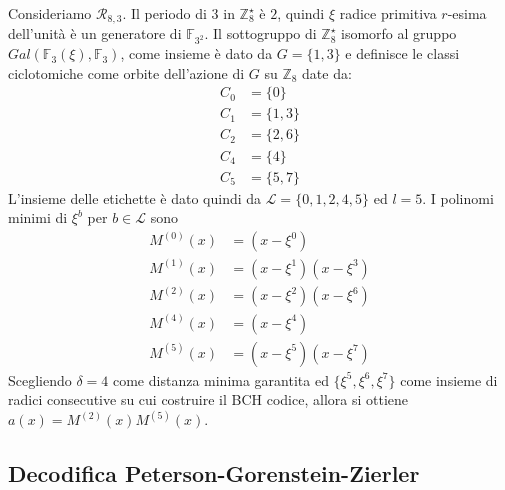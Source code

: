 \begin{esempio}
   Consideriamo $\mathcal{R}_{8,3}$. Il periodo di $3$ in $\mathbb{Z}_{8}^{\star}$ è $2$, quindi $\xi$ radice primitiva $r$-esima dell'unità è un generatore di $\mathbb{F}_{3^2}$. Il sottogruppo di $\mathbb{Z}_{8}^{\star}$ isomorfo al gruppo $Gal(\mathbb{F}_{3}(\xi), \mathbb{F}_{3})$, come insieme è dato da $G = \lbrace 1,3 \rbrace$ e definisce le classi ciclotomiche come orbite dell'azione di $G$ su $\mathbb{Z}_{8}$ date da:
   \begin{align*}
      C_{0} &= \lbrace 0 \rbrace \\
      C_{1} &= \lbrace 1,3 \rbrace \\
      C_{2} &= \lbrace 2,6 \rbrace \\
      C_{4} &= \lbrace 4 \rbrace \\
      C_{5} &= \lbrace 5,7 \rbrace
   \end{align*}
   L'insieme delle etichette è dato quindi da $\mathscr{L} = \lbrace 0,1,2,4,5 \rbrace $ ed $l = 5$. I polinomi minimi di $\xi^{b}$ per $b\in \mathscr{L}$ sono
   \begin{align*}
      M^{(0)}(x) &= (x - \xi^{0}) \\
      M^{(1)}(x) &=  (x - \xi^{1})(x - \xi^{3}) \\
      M^{(2)}(x) &=  (x - \xi^{2})(x - \xi^{6})  \\
      M^{(4)}(x) &=  (x - \xi^{4}) \\
      M^{(5)}(x) &=  (x - \xi^{5})(x - \xi^{7})
   \end{align*}
   Scegliendo $\delta = 4$ come distanza minima garantita ed $\lbrace \xi^{5}, \xi^{6}, \xi^{7} \rbrace$ come insieme di radici consecutive su cui costruire il BCH codice, allora si ottiene $a(x) = M^{(2)}(x)M^{(5)}(x)$.
\end{esempio}


\subsection{Decodifica Peterson-Gorenstein-Zierler}

